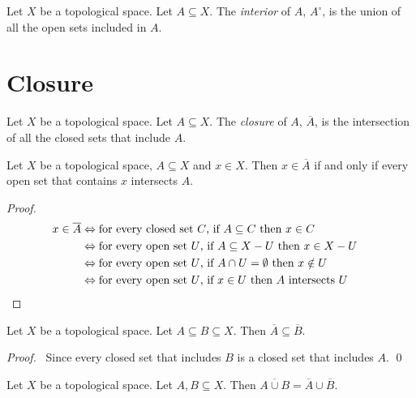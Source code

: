 \begin{df}[Interior]
Let $X$ be a topological space. Let $A \subseteq X$. The \emph{interior} of $A$, $A^\circ$, is the union of all the open sets included in $A$.
\end{df}

\section{Closure}

\begin{df}[Closure]
Let $X$ be a topological space. Let $A \subseteq X$. The \emph{closure} of $A$, $\overline{A}$, is the intersection of all the closed sets that include $A$.
\end{df}

\begin{prop}
\label{prop:closure}
Let $X$ be a topological space, $A \subseteq X$ and $x \in X$. Then $x \in \overline{A}$ if and only if every open set that contains $x$ intersects $A$.
\end{prop}

\begin{proof}
\pf
\begin{align*}
x \in \overline{A} & \Leftrightarrow \text{for every closed set $C$, if $A \subseteq C$ then $x \in C$} \\
& \Leftrightarrow \text{for every open set $U$, if $A \subseteq X - U$ then $x \in X - U$} \\
& \Leftrightarrow \text{for every open set $U$, if $A \cap U = \emptyset$ then $x \notin U$} \\
& \Leftrightarrow \text{for every open set $U$, if $x \in U$ then $A$ intersects $U$} & \qed
\end{align*}
\end{proof}

\begin{prop}
\label{prop:closure_monotone}
Let $X$ be a topological space. Let $A \subseteq B \subseteq X$. Then $\overline{A} \subseteq \overline{B}$.
\end{prop}

\begin{proof}
\pf\ Since every closed set that includes $B$ is a closed set that includes $A$. \qed
\end{proof}

\begin{prop}
Let $X$ be a topological space. Let $A,B \subseteq X$. Then $\overline{A \cup B} = \overline{A} \cup \overline{B}$.
\end{prop}

